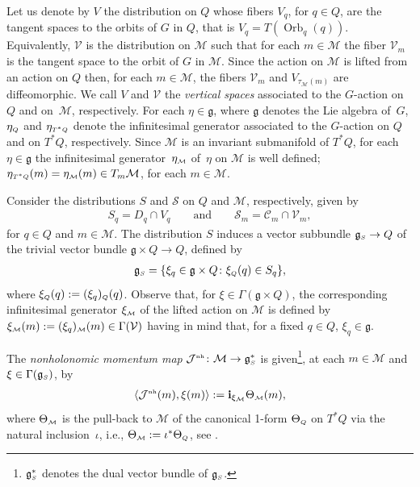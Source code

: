 \documentclass[pdftex]{sigma}
\numberwithin{equation}{section}
\def\M{\mathcal{M}}
\def\V{\mathcal{V}}
\def\S{\mathcal{S}}
\def\C{\mathcal{C}}
\def\g{\mathfrak{g}}
\def\nh{{\mbox{\tiny{nh}}}}
\def\subM{{\mbox{\tiny{$\M$}}}}
\def\subSS{{\mbox{\tiny{$S$}}}}
\def\subQQ{{\mbox{\tiny{$Q$}}}}
\begin{document}
Let us denote by $V$ the distribution on $Q$ whose f\/ibers $V_q$, for $q\in Q$, are the tangent
spaces to the orbits of $G$ in $Q$, that is $V_q = T(\operatorname{Orb}_q(q))$. Equivalently,
$\V$ is the distribution on $\M$ such that for each $m\in \M$ the f\/iber $\V_m$
is the tangent space to the orbit of $G$ in $\M$.
Since the action on $\M$ is lifted from an action on $Q$ then, for each $m\in \M$,
the f\/ibers $\V_m$ and $V_{\tau_\M(m)}$ are dif\/feomorphic. We call $V$ and $\V$
the {\it vertical spaces} associated to the $G$-action on~$Q$ and on~$\M$, respectively.
For each $\eta\in \mathfrak{g}$, where $\mathfrak{g}$ denotes the Lie algebra of~$G$,
$\eta_{\mbox{\tiny{$Q$}}}$ and $\eta_{\mbox{\tiny{$T^*Q$}}}$ denote the inf\/initesimal
generator associated to the $G$-action on $Q$ and on $T^*Q$, respectively.
Since $\M$ is an invariant submanifold of $T^*Q$, for each $\eta\in\g$ the
inf\/initesimal generator~$\eta_\subM$ of~$\eta$ on $\M$ is well def\/ined;  $\eta_{\mbox{\tiny{$T^*Q$}}} (m) = \eta_\subM (m) \in T_m\M$, for each $m\in\M$.

Consider the distributions $S$ and $\S$ on $Q$ and $\M$, respectively,
given by
\begin{gather*}
  S_q = D_q \cap V_q \qquad \mbox{and} \qquad \S_m = \C_m\cap\V_m,
\end{gather*}
for $q\in Q$ and $m\in \M$.
The distribution $S$
induces a vector subbundle  $\mathfrak{g}_\subSS \to Q$
of the trivial vector bundle $\mathfrak{g}\times Q \to Q$, def\/ined by
\begin{gather} \label{Def:S}
 \mathfrak{g}_\subSS = \{ \xi _q \in \mathfrak{g}\times Q \colon \xi_{\mbox{\tiny{$Q$}}}(q) \in S_q\},
 \end{gather}
where $\xi_\subQQ(q) := (\xi_q)_\subQQ (q)$.  Observe that, for
$\xi\in \Gamma(\mathfrak{g} \times Q)$, the corresponding inf\/initesimal generator
$\xi_\subM$ of the lifted action on $\M$ is def\/ined by
$\xi_\subM (m) := (\xi_q)_\subM(m)\in \Gamma(\V)$ having in mind that, for a f\/ixed $q\in Q$, $\xi_q\in\g$.

The {\it nonholonomic momentum map} \cite{BKMM} ${\mathcal J}^{\nh} \colon \M \to \mathfrak{g}_\subSS^*$
is given\footnote{$\mathfrak{g}^*_\subSS$ denotes the dual vector bundle of $\mathfrak{g}_\subSS$.},
at each $m \in \M$ and $\xi \in \Gamma(\mathfrak{g}_\subSS)$, by
\begin{gather}\label{Eq:NH-momentum}
\langle {\mathcal J}^{\nh}(m) , \xi (m) \rangle := {\bf i}_{\xi_\M} \Theta_\subM (m)  ,
\end{gather}
where $\Theta_\subM$ is the pull-back to $\M$ of the canonical 1-form
$\Theta_{\mbox{\tiny{$Q$}}}$ on $T^*Q$ via the natural inclu\-sion~$\iota$, i.e.,
$\Theta_\subM := \iota^*\Theta_{\mbox{\tiny{$Q$}}}$, see \cite{Paula, BKMM}.
\end{document}
